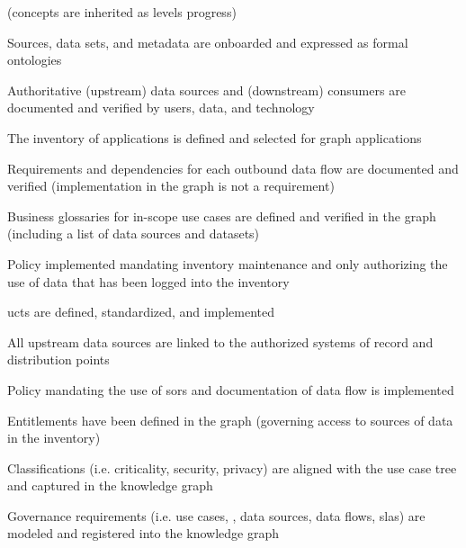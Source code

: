 \kgmmscoringsection

(concepts are inherited as levels progress)

\kgmmscoringlevelOne

\begin{scoring}

  \item Sources, data sets, and metadata are onboarded and expressed as formal ontologies
  \item Authoritative (upstream) data sources and (downstream) consumers are documented and verified by users,
        data, and technology
  \item The inventory of applications is defined and selected for graph applications
  \item Requirements and dependencies for each outbound data flow are documented and verified (implementation in the
        graph is not a requirement)
  \item Business glossaries for in-scope use cases are defined and verified in the graph (including a list of
        data sources and datasets)
  \item Policy implemented mandating inventory maintenance and only authorizing the use of data that has been logged
        into the inventory

\end{scoring}

\kgmmscoringlevelTwo

\begin{scoring}

  \item \glspl{uct} are defined, standardized, and implemented
  \item All upstream data sources are linked to the authorized systems of record and distribution points
  \item Policy mandating the use of \glspl{sor} and documentation of data flow is implemented
  \item Entitlements have been defined in the graph (governing access to sources of data in the inventory)
  \item Classifications (i.e. criticality, security, privacy) are aligned with the use case tree and captured in the
        knowledge graph
  \item Governance requirements (i.e. use cases, , data sources, data flows, \glspl{sla})
        are modeled and registered into the knowledge graph

\end{scoring}

